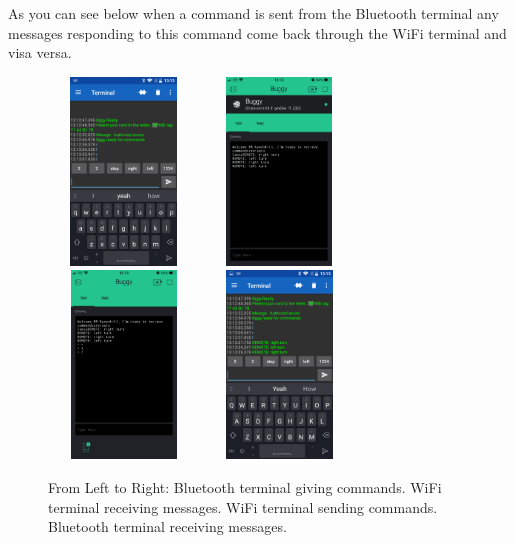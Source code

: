 \documentclass[8pt, a4paper]{article}
\begin{document}
As you can see below when a command is sent from the Bluetooth terminal any messages responding to this command come back through the WiFi terminal and visa versa. 

\begin{figure}[H]
	\centering
	\includegraphics[height=5.0cm, width=4.0cm]{BLE_term}
	\includegraphics[height=5.0cm, width=4.0cm]{blynk_term2}
	\includegraphics[height=5.0cm, width=4.0cm]{blynk_term}
	\includegraphics[height=5.0cm, width=4.0cm]{BLE_term2}
	\caption{From Left to Right: Bluetooth terminal giving commands. WiFi terminal receiving messages. WiFi terminal sending commands. Bluetooth terminal receiving messages.}			
\end{figure}	
\end{document}

